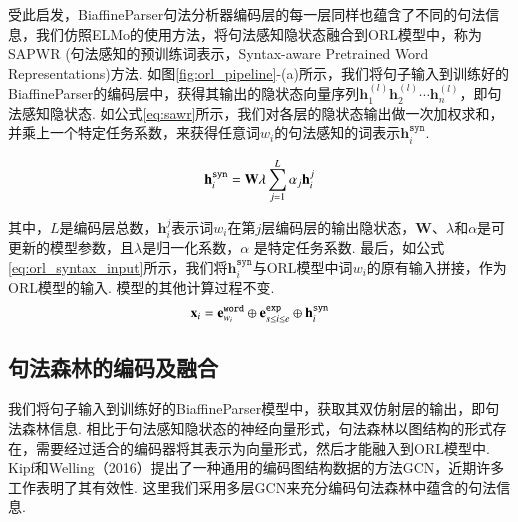 受此启发，BiaffineParser句法分析器编码层的每一层同样也蕴含了不同的句法信息，我们仿照ELMo的使用方法，将句法感知隐状态融合到ORL模型中，称为SAPWR (句法感知的预训练词表示，Syntax-aware Pretrained Word Representations)方法. 如图\ref{fig:orl_pipeline}-(a)所示，我们将句子输入到训练好的BiaffineParser的编码层中，获得其输出的隐状态向量序列$\mathbf{h}_1^{(l)}\mathbf{h}_2^{(l)} \cdots \mathbf{h}_n^{(l)}$，即句法感知隐状态. 如公式\ref{eq:sawr}所示，我们对各层的隐状态输出做一次加权求和，并乘上一个特定任务系数，来获得任意词$w_i$的句法感知的词表示$\mathbf{h}_i^{\texttt{syn}}$.


\begin{equation}
    \setlength{\abovedisplayskip}{9pt}
    \setlength{\belowdisplayskip}{9pt}
    \label{eq:sawr}
    \mathbf{h}_i^{\texttt{syn}} = \mathbf{W} \lambda \sum_{j=1}^{L}\alpha_j \mathbf{h}_i^j
\end{equation}

其中，$L$是编码层总数，$\mathbf{h}_i^j$表示词$w_i$在第$j$层编码层的输出隐状态，$\mathbf{W}$、$\lambda$和$\alpha$是可更新的模型参数，且$\lambda$是归一化系数，$\alpha$ 是特定任务系数.
最后，如公式\ref{eq:orl_syntax_input}所示，我们将$\mathbf{h}_i^{\texttt{syn}}$与ORL模型中词$w_i$的原有输入拼接，作为ORL模型的输入. 模型的其他计算过程不变.
\begin{equation}
    \setlength{\abovedisplayskip}{9pt}
    \setlength{\belowdisplayskip}{9pt}
    \label{eq:orl_syntax_input}
    \mathbf{x}_i = \mathbf{e}_{w_i}^{\texttt{word}} \oplus \mathbf{e}_{s\leq i\leq e}^{\texttt{exp}} \oplus \mathbf{h}_i^{\texttt{syn}}
\end{equation}
\subsection{句法森林的编码及融合}
\label{sec:gcnforest}
我们将句子输入到训练好的BiaffineParser模型中，获取其双仿射层的输出，即句法森林信息.
相比于句法感知隐状态的神经向量形式，句法森林以图结构的形式存在，需要经过适合的编码器将其表示为向量形式，然后才能融入到ORL模型中.
Kipf和Welling（2016）提出了一种通用的编码图结构数据的方法GCN，近期许多工作表明了其有效性. 这里我们采用多层GCN来充分编码句法森林中蕴含的句法信息.

